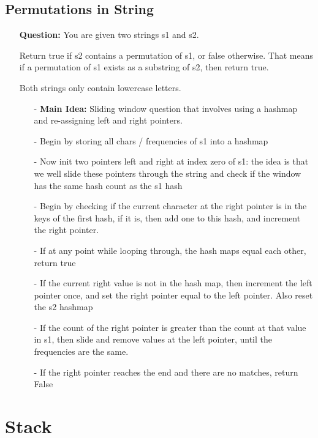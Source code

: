 \documentclass[12pt]{article}
\begin{document}
\subsection{Permutations in String}
\begin{enumerate}
  \item[] \textbf{Question:} You are given two strings s1 and s2.

Return true if s2 contains a permutation of s1, or false otherwise. That means if a permutation of s1 exists as a substring of s2, then return true.

Both strings only contain lowercase letters.

    \begin{enumerate}
      \item[-] \textbf{Main Idea: } Sliding window question that involves using a hashmap and re-assigning left and right pointers. 
      \item[-] Begin by storing all chars / frequencies of s1 into a hashmap
      \item[-] Now init two pointers left and right at index zero of s1: the idea is that we well slide these pointers through the string and check if the window has the same hash count as the s1 hash
      \item[-] Begin by checking if the current character at the right pointer is in the keys of the first hash, if it is, then add one to this hash, and increment the right pointer. 
      \item[-] If at any point while looping through, the hash maps equal each other, return true
      \item[-] If the current right value is not in the hash map, then increment the left pointer once, and set the right pointer equal to the left pointer. Also reset the s2 hashmap
      \item[-] If the count of the right pointer is greater than the count at that value in s1, then slide and remove values at the left pointer, until the frequencies are the same.
      \item[-] If the right pointer reaches the end and there are no matches, return False
    \end{enumerate}
\end{enumerate}




\section{Stack}
\end{document}
